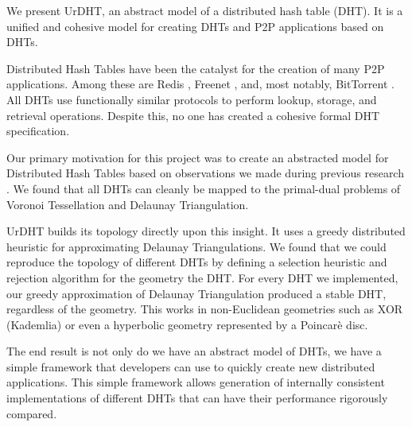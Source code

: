 \documentclass[11pt,conference]{IEEEtran}
\begin{document}



We present UrDHT, an abstract model of a distributed hash table (DHT). %
It is a unified and cohesive model for creating DHTs and P2P applications based on DHTs.
%

Distributed Hash Tables have been the catalyst for the creation of many P2P applications.
Among these are Redis \cite{redis}, Freenet \cite{freenet}, and, most notably, BitTorrent \cite{bittorrent}. 
All DHTs use functionally similar protocols to perform lookup, storage, and retrieval operations.
Despite this, no one has created a cohesive formal DHT specification.

Our primary motivation for this project was to create an abstracted model for Distributed Hash Tables based on observations we made during previous research \cite{dgvh}.
We found that all DHTs can cleanly be mapped to the primal-dual problems of Voronoi Tessellation and Delaunay Triangulation.

UrDHT builds its topology directly upon this insight.
It uses a greedy distributed heuristic for approximating Delaunay Triangulations.
We found that we could reproduce the topology of different DHTs by defining a selection heuristic and rejection algorithm for the geometry the DHT.
For every DHT we implemented, our greedy approximation of Delaunay Triangulation produced a stable DHT, regardless of the geometry.  
This works in non-Euclidean geometries such as XOR (Kademlia) or even a hyperbolic geometry represented by a Poincar\`{e} disc.

The end result is not only do we have an abstract model of DHTs, we have a simple framework that developers can use to quickly create new distributed applications.
This simple framework allows generation of internally consistent implementations of different DHTs that can have their performance rigorously compared.  %
\end{document}
